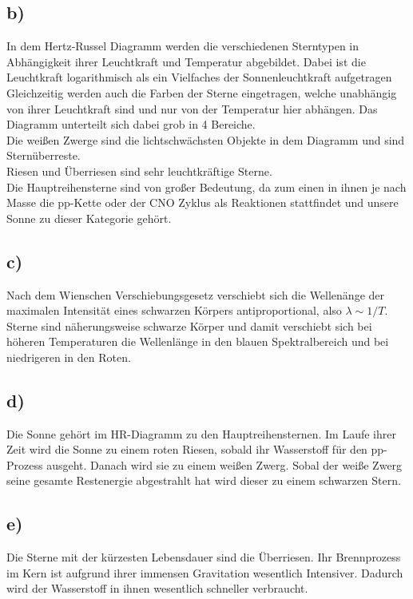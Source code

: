 \subsection{b)}
In dem Hertz-Russel Diagramm werden die verschiedenen Sterntypen
in Abhängigkeit ihrer Leuchtkraft und Temperatur abgebildet.
Dabei ist die Leuchtkraft logarithmisch als ein Vielfaches der
Sonnenleuchtkraft aufgetragen
Gleichzeitig werden auch die Farben der Sterne eingetragen, welche unabhängig
von ihrer Leuchtkraft sind und nur von der Temperatur hier abhängen.
Das Diagramm unterteilt sich dabei grob in 4 Bereiche.\\
Die weißen Zwerge sind die lichtschwächsten Objekte in dem Diagramm und sind Sternüberreste.\\
Riesen und Überriesen sind sehr leuchtkräftige Sterne.\\
Die Hauptreihensterne sind von großer Bedeutung, da zum einen in ihnen je nach Masse 
die pp-Kette oder der CNO Zyklus als Reaktionen stattfindet und unsere Sonne zu dieser Kategorie gehört.


\subsection{c)}

Nach dem Wienschen Verschiebungsgesetz verschiebt sich die Wellenänge der maximalen Intensität eines schwarzen Körpers
antiproportional, also $\lambda \sim 1/T $. Sterne sind näherungsweise schwarze Körper und damit
verschiebt sich bei höheren Temperaturen die Wellenlänge in den blauen Spektralbereich und bei 
niedrigeren in den Roten.

\subsection{d)}

Die Sonne gehört im HR-Diagramm zu den Hauptreihensternen. Im Laufe ihrer Zeit wird die Sonne 
zu einem roten Riesen, sobald ihr Wasserstoff für den pp-Prozess ausgeht.
Danach wird sie zu einem weißen Zwerg. Sobal der weiße Zwerg seine gesamte Restenergie abgestrahlt hat
wird dieser zu einem schwarzen Stern.

\subsection{e)}

Die Sterne mit der kürzesten Lebensdauer sind die Überriesen. Ihr Brennprozess im Kern ist aufgrund ihrer
immensen Gravitation wesentlich Intensiver. Dadurch wird der Wasserstoff in ihnen wesentlich schneller verbraucht.




